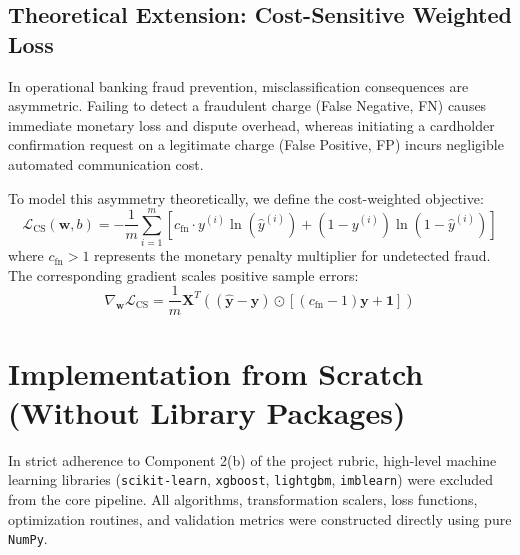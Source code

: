\documentclass[11pt,a4paper]{article}
\begin{document}
\subsection{Theoretical Extension: Cost-Sensitive Weighted Loss}
In operational banking fraud prevention, misclassification consequences are asymmetric. Failing to detect a fraudulent charge (False Negative, FN) causes immediate monetary loss and dispute overhead, whereas initiating a cardholder confirmation request on a legitimate charge (False Positive, FP) incurs negligible automated communication cost. 

To model this asymmetry theoretically, we define the cost-weighted objective:
\begin{equation}
    \mathcal{L}_{\text{CS}}(\mathbf{w}, b) = -\frac{1}{m} \sum_{i=1}^m \left[ c_{\text{fn}} \cdot y^{(i)} \ln\left(\hat{y}^{(i)}\right) + \left(1 - y^{(i)}\right) \ln\left(1 - \hat{y}^{(i)}\right) \right]
\end{equation}
where $c_{\text{fn}} > 1$ represents the monetary penalty multiplier for undetected fraud. The corresponding gradient scales positive sample errors:
\begin{equation}
    \nabla_{\mathbf{w}} \mathcal{L}_{\text{CS}} = \frac{1}{m} \mathbf{X}^T \left( (\hat{\mathbf{y}} - \mathbf{y}) \odot \left[ (c_{\text{fn}} - 1)\mathbf{y} + \mathbf{1} \right] \right)
\end{equation}

\section{Implementation from Scratch (Without Library Packages)}
\label{sec:implementation}

In strict adherence to Component 2(b) of the project rubric, high-level machine learning libraries (\texttt{scikit-learn}, \texttt{xgboost}, \texttt{lightgbm}, \texttt{imblearn}) were excluded from the core pipeline. All algorithms, transformation scalers, loss functions, optimization routines, and validation metrics were constructed directly using pure \texttt{NumPy}.
\end{document}
